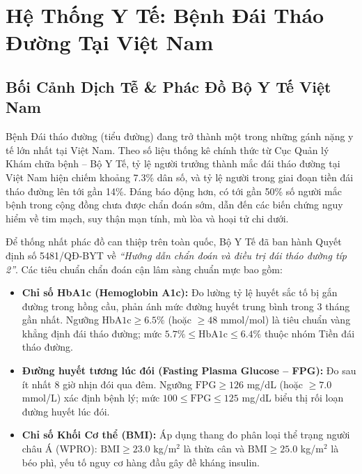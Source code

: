 \documentclass[12pt,a4paper]{report}
\begin{document}
\newpage

\chapter{Hệ Thống Y Tế: Bệnh Đái Tháo Đường Tại Việt Nam}

\section{Bối Cảnh Dịch Tễ \& Phác Đồ Bộ Y Tế Việt Nam}

Bệnh Đái tháo đường (tiểu đường) đang trở thành một trong những gánh nặng y tế lớn nhất tại Việt Nam. Theo số liệu thống kê chính thức từ Cục Quản lý Khám chữa bệnh -- Bộ Y Tế, tỷ lệ người trưởng thành mắc đái tháo đường tại Việt Nam hiện chiếm khoảng 7.3\% dân số, và tỷ lệ người trong giai đoạn tiền đái tháo đường lên tới gần 14\%. Đáng báo động hơn, có tới gần 50\% số người mắc bệnh trong cộng đồng chưa được chẩn đoán sớm, dẫn đến các biến chứng nguy hiểm về tim mạch, suy thận mạn tính, mù lòa và hoại tử chi dưới.

Để thống nhất phác đồ can thiệp trên toàn quốc, Bộ Y Tế đã ban hành Quyết định số 5481/QĐ-BYT về \textit{“Hướng dẫn chẩn đoán và điều trị đái tháo đường típ 2”}. Các tiêu chuẩn chẩn đoán cận lâm sàng chuẩn mực bao gồm:
\begin{itemize}
    \item \textbf{Chỉ số HbA1c (Hemoglobin A1c):} Đo lường tỷ lệ huyết sắc tố bị gắn đường trong hồng cầu, phản ánh mức đường huyết trung bình trong 3 tháng gần nhất. Ngưỡng $\text{HbA1c} \ge 6.5\%$ (hoặc $\ge 48$ mmol/mol) là tiêu chuẩn vàng khẳng định đái tháo đường; mức $5.7\% \le \text{HbA1c} \le 6.4\%$ thuộc nhóm Tiền đái tháo đường.
    \item \textbf{Đường huyết tương lúc đói (Fasting Plasma Glucose -- FPG):} Đo sau ít nhất 8 giờ nhịn đói qua đêm. Ngưỡng $\text{FPG} \ge 126$ mg/dL (hoặc $\ge 7.0$ mmol/L) xác định bệnh lý; mức $100 \le \text{FPG} \le 125$ mg/dL biểu thị rối loạn đường huyết lúc đói.
    \item \textbf{Chỉ số Khối Cơ thể (BMI):} Áp dụng thang đo phân loại thể trạng người châu Á (WPRO): $\text{BMI} \ge 23.0$ kg/m$^2$ là thừa cân và $\text{BMI} \ge 25.0$ kg/m$^2$ là béo phì, yếu tố nguy cơ hàng đầu gây đề kháng insulin.
\end{itemize}
\end{document}
